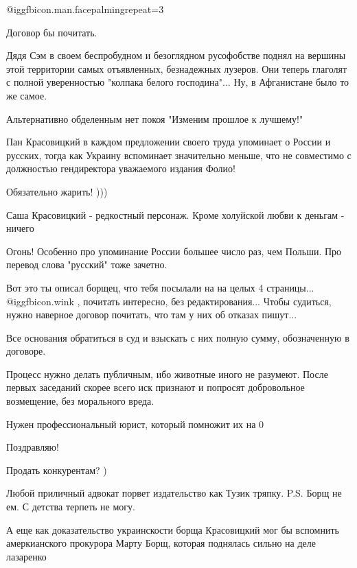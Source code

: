 \begin{itemize}
 @igg{fbicon.man.facepalming}{repeat=3} 

Договор бы почитать.


Дядя Сэм в своем беспробудном и безоглядном русофобстве поднял на вершины этой
территории самых отъявленных, безнадежных лузеров. Они теперь глаголят с полной
уверенностью "колпака белого господина"... Ну, в Афганистане было то же самое.

Альтернативно обделенным нет покоя
"Изменим прошлое к лучшему!"

Пан Красовицкий в каждом предложении своего труда упоминает о России и русских, тогда как Украину вспоминает значительно меньше, что не совместимо с должностью гендиректора уважаемого издания Фолио!

Обязательно жарить! )))

Саша Красовицкий - редкостный персонаж. Кроме холуйской любви к деньгам - ничего

Огонь! Особенно про упоминание России большее число раз, чем Польши. Про перевод слова "русский" тоже зачетно.

Вот это ты описал борщец, что тебя посылали на на целых 4 страницы...  @igg{fbicon.wink} , почитать интересно, без редактирования... Чтобы судиться, нужно наверное договор почитать, что там у них об отказах пишут...


Все основания обратиться в суд и взыскать с них полную сумму, обозначенную в
договоре.

Процесс нужно делать публичным, ибо животные иного не разумеют. После первых
заседаний скорее всего иск признают и попросят добровольное возмещение, без
морального вреда.

Нужен профессиональный юрист, который помножит их на 0

Поздравляю!

Продать конкурентам? )

Любой приличный адвокат порвет издательство как Тузик тряпку.
P.S. Борщ не ем. С детства терпеть не могу.


А еще как доказательство украинскости борща Красовицкий мог бы вспомнить
амеркианского прокурора Марту Борщ, которая поднялась сильно на деле лазаренко


\end{itemize}
